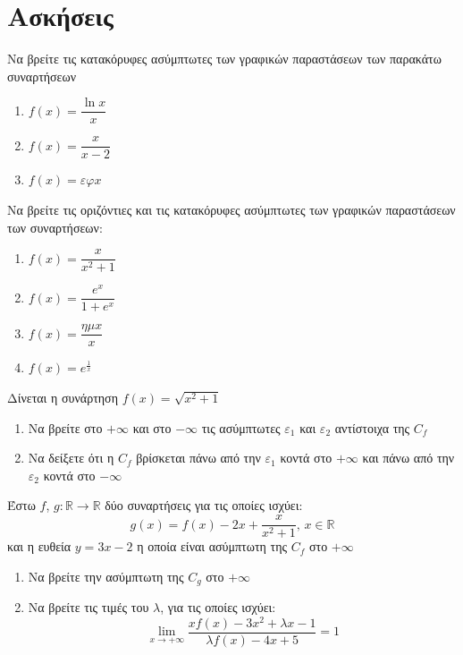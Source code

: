 \documentclass{presentation}
\begin{document}
\moodle

\section{Ασκήσεις}

\exercises

\begin{askisi}
  Να βρείτε τις κατακόρυφες ασύμπτωτες των γραφικών παραστάσεων των παρακάτω συναρτήσεων
  \begin{enumerate}
    \item<1-> $f(x)=\dfrac{\ln x}{x}$
    \item<2-> $f(x)=\dfrac{x}{x-2}$
    \item<3-> $f(x)=εφ x$
  \end{enumerate}

\end{askisi}

\begin{askisi}
  Να βρείτε τις οριζόντιες και τις κατακόρυφες ασύμπτωτες των γραφικών παραστάσεων των συναρτήσεων:
  \begin{enumerate}
    \item<1-> $f(x)=\dfrac{x}{x^2+1}$
    \item<2-> $f(x)=\dfrac{e^x}{1+e^x}$
    \item<3-> $f(x)=\dfrac{ημx}{x}$
    \item<4-> $f(x)=e^{\frac{1}{x}}$
  \end{enumerate}

\end{askisi}

\begin{askisi}
  Δίνεται η συνάρτηση $f(x)=\sqrt{x^2+1}$
  \begin{enumerate}
    \item<1-> Να βρείτε στο $+\infty$ και στο $-\infty$ τις ασύμπτωτες $ε_1$ και $ε_2$ αντίστοιχα της $C_f$
    \item<2-> Να δείξετε ότι η $C_f$ βρίσκεται πάνω από την $ε_1$ κοντά στο $+\infty$ και πάνω από την $ε_2$ κοντά στο $-\infty$
  \end{enumerate}

\end{askisi}

\begin{askisi}
  Έστω $f$, $g:\mathbb{R}\to\mathbb{R}$ δύο συναρτήσεις για τις οποίες ισχύει:
  $$g(x)=f(x)-2x+\dfrac{x}{x^2+1} \text{, } x\in\mathbb{R}$$
  και η ευθεία $y=3x-2$ η οποία είναι ασύμπτωτη της $C_f$ στο $+\infty$
  \begin{enumerate}
    \item<1-> Να βρείτε την ασύμπτωτη της $C_g$ στο $+\infty$
    \item<2-> Να βρείτε τις τιμές του $λ$, για τις οποίες ισχύει:
          $$\lim\limits_{x \to +\infty}{ \dfrac{xf(x)-3x^2+λx-1}{λf(x)-4x+5} }=1$$
  \end{enumerate}

\end{askisi}
\end{document}
